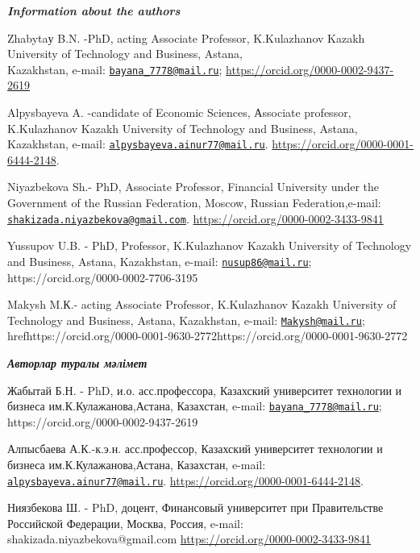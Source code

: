 \begin{authorinfo}
\emph{{\bfseries Information about the authors}}

Zhabytaу B.N. -PhD, acting Associate Professor, K.Kulazhanov Kazakh
University of Technology and Business, Astana, \\Kazakhstan, e-mail:
\href{mailto:bayana_7778@mail.ru}{\nolinkurl{bayana\_7778@mail.ru}};
\href{https://orcid.org/0000-0002-9437-2619}{https://orcid.org/0000-0002-9437-2619}

Alpysbayeva A. -candidate of Economic Sciences, Аssociate professor,
K.Kulazhanov Kazakh University of Technology and Business, Astana,
Kazakhstan, e-mail:
\href{mailto:alpysbayeva.ainur77@mail.ru}{\nolinkurl{alpysbayeva.ainur77@mail.ru}}.
\href{https://orcid.org/\%200000-0001-6444-2148}{https://orcid.org/0000-0001-6444-2148}.

Niyazbekova Sh.- PhD, Associate Professor, Financial University under
the Government of the Russian Federation, Moscow, Russian
Federation,e-mail:
\href{mailto:shakizada.niyazbekova@gmail.com}{\nolinkurl{shakizada.niyazbekova@gmail.com}}.
\href{https://orcid.org/0000-0002-3433-9841}{https://orcid.org/0000-0002-3433-9841}

Yussupov U.B. - PhD, Professor, K.Kulazhanov Kazakh University of
Technology and Business, Astana, Kazakhstan, e-mail:
\href{mailto:nusup86@mail.ru}{\nolinkurl{nusup86@mail.ru}};
https://orcid.org/0000-0002-7706-3195

Makysh M.К.- acting Associate Professor, K.Kulazhanov Kazakh University
of Technology and Business, Astana, Kazakhstan, e-mail:
\href{mailto:Makysh@mail.ru}{\nolinkurl{Makysh@mail.ru}};
href{https://orcid.org/0000-0001-9630-2772}{https://orcid.org/0000-0001-9630-2772}

\emph{{\bfseries Авторлар туралы мәлімет}}

Жабытай Б.Н. - PhD, и.о. асс.профессора, Казахский университет
технологии и бизнеса им.К.Кулажанова,Астана, Казахстан, e-mail:
\href{mailto:bayana_7778@mail.ru}{\nolinkurl{bayana\_7778@mail.ru}};
https://orcid.org/0000-0002-9437-2619

Алпысбаева А.К.-к.э.н. асс.профессор, Казахский университет технологии и
бизнеса им.К.Кулажанова,Астана, Казахстан, e-mail:
\href{mailto:alpysbayeva.ainur77@mail.ru}{\nolinkurl{alpysbayeva.ainur77@mail.ru}}.
\href{https://orcid.org/\%200000-0001-6444-2148}{https://orcid.org/0000-0001-6444-2148}.

Ниязбекова Ш. - PhD, доцент, Финансовый университет при Правительстве
Российской Федерации, Москва, Россия, e-mail:
shakizada.niyazbekova@gmail.com \href{https://orcid.org/0000-0002-3433-9841}{https://orcid.org/0000-0002-3433-9841}


\end{authorinfo}
